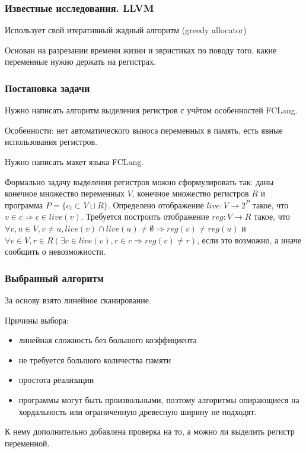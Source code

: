 \documentclass[10pt,a4paper]{beamer}
\begin{document}
\begin{frame}
    \frametitle{Известные исследования. LLVM}
    Использует свой итеративный жадный алгоритм (greedy allocator)

    Основан на разрезании времени жизни и эвристиках по поводу того, какие переменные нужно держать на регистрах.

\end{frame}

\begin{frame}
    \frametitle{Постановка задачи}
    Нужно написать алгоритм выделения регистров с учётом особенностей FCLang.

    Особенности: нет автоматического выноса переменных в память, есть явные использования регистров.

    Нужно написать макет языка FCLang.

    Формально задачу выделения регистров можно сформулировать так: даны конечное множество переменных $V$,
    конечное множество регистров $R$ и программа $P = \{ c_i \subset V \sqcup R \}$.
    Определено отображение $live : V \rightarrow 2^P$ такое, что $v \in c \Rightarrow c \in live(v)$.
    Требуется построить отображение $reg : V \rightarrow R$ такое, что $\forall v, u \in V, v \neq u, live(v) \cap live(u) \neq \emptyset \Rightarrow reg(v) \neq reg(u)$
    и $\forall v \in V, r \in R \left(\exists c \in live(v), r \in c \Rightarrow reg(v) \neq r \right)$, если это возможно, а иначе сообщить о невозможности.
\end{frame}

\begin{frame}
    \frametitle{Выбранный алгоритм}

    За основу взято линейное сканирование.

    Причины выбора:
    \begin{itemize}
        \item линейная сложность без большого коэффициента
        \item не требуется большого количества памяти
        \item простота реализации
        \item программы могут быть произвольными, поэтому алгоритмы опирающиеся на хордальность или ограниченную древесную ширину не подходят.
    \end{itemize}

    К нему дополнительно добавлена проверка на то, а можно ли выделить регистр переменной.


\end{frame}
\end{document}
